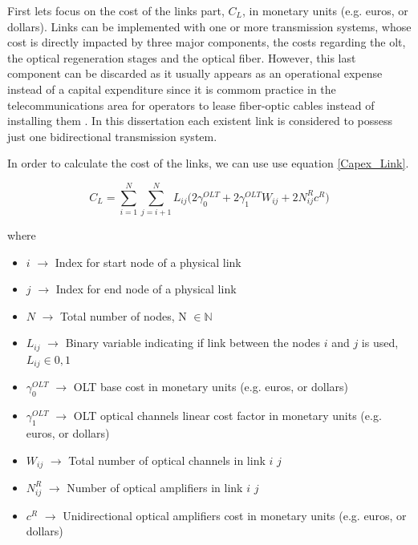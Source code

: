  First lets focus on the cost of the links part, $C_L$, in monetary units (e.g. euros, or dollars). Links can be implemented with one or more transmission systems, whose cost is directly impacted by three major components, the costs regarding the \gls{olt}, the optical regeneration stages and the optical fiber. However, this last component can be discarded as it usually appears as an operational expense instead of a capital expenditure since it is commom practice in the telecommunications area for operators to lease fiber-optic cables instead of installing them \cite{anpinto}. In this dissertation each existent link is considered to possess just one bidirectional transmission system. %
 

\vspace{11pt}

In order to calculate the cost of the links, we can use use equation \ref{Capex_Link}.

\begin{equation}
C_L = \sum_{i=1}^N \sum_{j=i+1}^N L_{ij} \bigg( 2 \gamma_0^{OLT} + 2 \gamma_1^{OLT} W_{ij} + 2 N^R_{ij} c^R \bigg)
\label{Capex_Link}
\end{equation}

\noindent
where
\begin{itemize}
\item{$i$               $\rightarrow$   Index for start node of a physical link}
\item{$j$               $\rightarrow$   Index for end node of a physical link}
\item{$N$				$\rightarrow$	Total number of nodes, N $\in \mathbb{N}$}
\item{$L_{ij}$			$\rightarrow$	Binary variable indicating if link between the nodes $i$ and $j$ is used, $L_{ij} \in {0, 1}$}
\item{$\gamma_0^{OLT}$	$\rightarrow$	OLT base cost in monetary units (e.g. euros, or dollars)}
\item{$\gamma_1^{OLT}$	$\rightarrow$	OLT optical channels linear cost factor in monetary units (e.g. euros, or dollars)}
\item{$W_{ij}$          $\rightarrow$   Total number of optical channels in link $i$ $j$}
\item{$N^R_{ij}$    	$\rightarrow$	Number of optical amplifiers in link $i$ $j$}
\item{$c^R$				$\rightarrow$	Unidirectional optical amplifiers cost in monetary units (e.g. euros, or dollars)}
\end{itemize}

